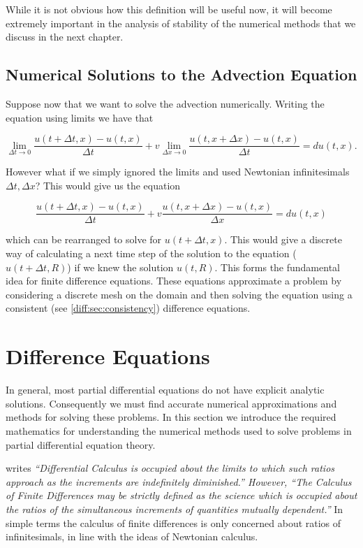 \documentclass[../main.tex]{subfiles}
\begin{document}
  While it is not obvious how this definition will be useful now, it will become extremely important in the analysis of stability of the numerical methods that we discuss in the next chapter.

  \subsection{Numerical Solutions to the Advection Equation} \label{diff:sec:fdesintro}
  Suppose now that we want to solve the advection numerically. Writing the equation using limits we have that

  \begin{equation} \label{diff:eq:finiteadvection}
    \lim_{\Delta t \to 0} \frac{u(t + \Delta t, x) - u(t, x)}{\Delta t} + v \lim_{\Delta x \to 0} \frac{u(t, x + \Delta x) - u(t, x)}{\Delta t} = d u(t, x).
  \end{equation}

  However what if we simply ignored the limits and used Newtonian infinitesimals $\Delta t, \Delta x$? This would give us the equation

  \begin{equation} \label{diff:eq:advectionfde}
    \frac{u(t + \Delta t, x) - u(t, x)}{\Delta t} + v \frac{u(t, x + \Delta x) - u(t, x)}{\Delta x} = d u(t, x)
  \end{equation}

  which can be rearranged to solve for $u(t + \Delta t, x)$. This would give a discrete way of calculating a next time step  of the solution to the equation ($u(t + \Delta t, R)$) if we knew the solution $u(t, R)$. This forms the fundamental idea for finite difference equations. These equations approximate a problem by considering a discrete mesh on the domain and then solving the equation using a consistent (see \autoref{diff:sec:consistency}) difference equations.

  \section{Difference Equations}
  In general, most partial differential equations do not have explicit analytic solutions. Consequently we must find accurate numerical approximations and methods for solving these problems. In this section we introduce the required mathematics for understanding the numerical methods used to solve problems in partial differential equation theory.

  \cite{boole1880} writes \emph{``Differential Calculus is occupied about the limits to which such ratios approach as the increments are indefinitely diminished.'' However, ``The Calculus of Finite Differences may be strictly defined as the science which is occupied about the ratios of the simultaneous increments of quantities mutually dependent.''} In simple terms the calculus of finite differences is only concerned about ratios of infinitesimals, in line with the ideas of Newtonian calculus.
\end{document}
